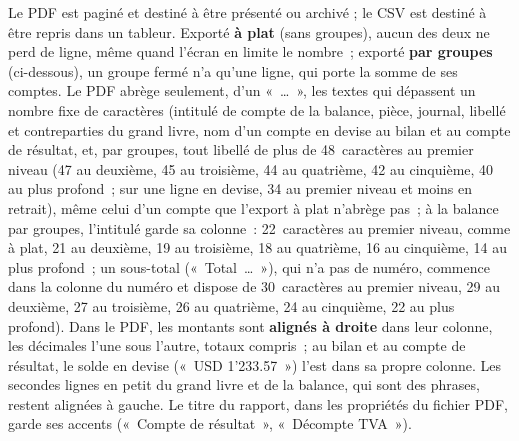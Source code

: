 \documentclass[a4paper,11pt,oneside]{article}
\begin{document}
\begin{keshnote}
Le PDF est paginé et destiné à être présenté ou archivé ; le CSV est destiné à être repris dans
un tableur. Exporté \textbf{à plat} (sans groupes), aucun des deux ne perd de ligne, même quand
l'écran en limite le nombre~; exporté \textbf{par groupes} (ci-dessous), un groupe fermé n'a qu'une
ligne, qui porte la somme de ses comptes. Le PDF abrège seulement, d'un «~…~», les textes qui
dépassent un nombre fixe de caractères (intitulé de compte de la balance, pièce, journal, libellé et
contreparties du grand livre, nom d'un compte en devise au bilan et au compte de résultat, et, par
groupes, tout libellé de plus de 48~caractères au premier niveau (47 au deuxième, 45 au troisième, 44 au quatrième,
42 au cinquième, 40 au plus profond~; sur une ligne en devise, 34 au premier niveau et moins en retrait), même celui d'un compte que l'export à plat n'abrège pas~;
à la balance par groupes, l'intitulé garde sa colonne~: 22~caractères au premier niveau, comme à plat, 21 au deuxième,
19 au troisième, 18 au quatrième, 16 au cinquième, 14 au plus profond~; un sous-total («~Total~\ldots~»), qui n'a pas de numéro,
commence dans la colonne du numéro et dispose de 30~caractères au premier niveau, 29 au deuxième, 27 au troisième,
26 au quatrième, 24 au cinquième, 22 au plus profond). Dans le PDF, les montants sont \textbf{alignés à droite} dans leur colonne,
les décimales l'une sous l'autre, totaux compris~; au bilan et au compte de résultat, le solde en
devise («~USD 1'233.57~») l'est dans sa propre colonne. Les secondes lignes en petit du grand livre
et de la balance, qui sont des phrases, restent alignées à gauche.
Le titre du rapport, dans les propriétés du fichier PDF, garde ses accents («~Compte de
résultat~», «~Décompte TVA~»).
\end{keshnote}
\end{document}
